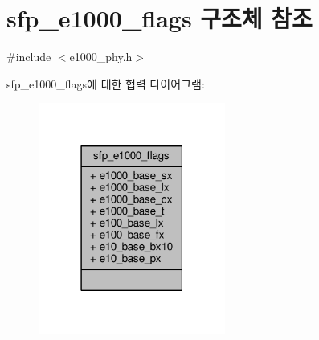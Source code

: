 \hypertarget{structsfp__e1000__flags}{}\section{sfp\+\_\+e1000\+\_\+flags 구조체 참조}
\label{structsfp__e1000__flags}


{\ttfamily \#include $<$e1000\+\_\+phy.\+h$>$}



sfp\+\_\+e1000\+\_\+flags에 대한 협력 다이어그램\+:
\nopagebreak
\begin{figure}[H]
\begin{center}
\leavevmode
\includegraphics[width=174pt]{structsfp__e1000__flags__coll__graph}
\end{center}
\end{figure}
